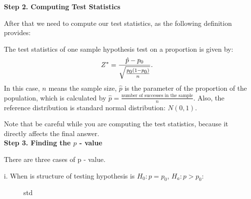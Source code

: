 \textbf{Step 2. Computing Test Statistics}

After that we need to compute our test statistics, as the following definition provides:

\begin{definition}
The test statistics of one sample hypothesis test on a proportion is given by: \[ Z^* = \frac{\hat{p} - p_{\text{\scriptsize$0$}}}{\sqrt{\frac{p_{\text{\scriptsize$0$}}(1-p_{\text{\scriptsize$0$}})}{n}}}.\]
In this case, $n$ means the sample size, $\hat{p}$ is the parameter of the proportion of the population, which is calculated by $\hat{p} = \frac{\text{number of successes in the sample}}{n}$. Also, the reference distribution is standard normal distribution: $N(0,1)$.
\end{definition}

Note that be careful while you are computing the test statistics, because it directly affects the final answer.\\

\textbf{Step 3. Finding the $p$ - value}

There are three cases of p - value.

i. When is structure of testing hypothesis is $H_0: p = p_0$, $H_a: p > p_0$:

\begin{center}
\begin{figure}[h!]
\centering
{}
\caption{std}
\end{figure}
\end{center}
